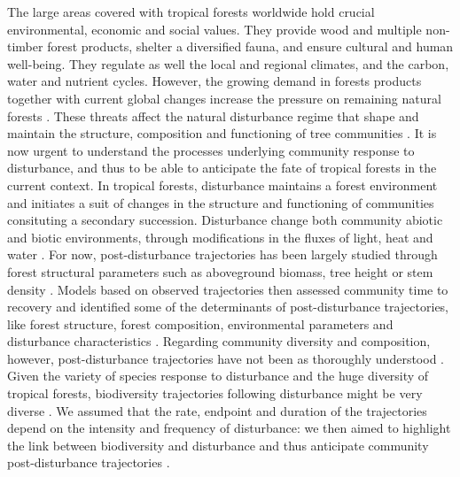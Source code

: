 \documentclass[fleqn,10pt]{ArtEcoFoG} %
\begin{document}
The large areas covered with tropical forests worldwide hold crucial
environmental, economic and social values. They provide wood and
multiple non-timber forest products, shelter a diversified fauna, and
ensure cultural and human well-being. They regulate as well the local
and regional climates, and the carbon, water and nutrient cycles.
However, the growing demand in forests products together with current
global changes increase the pressure on remaining natural forests
\citep{Morales-Hidalgo2015}. These threats affect the natural
disturbance regime that shape and maintain the structure, composition
and functioning of tree communities
\citep{Schnitzer2001, Anderson-Teixeira2013, Sist2015}. It is now urgent
to understand the processes underlying community response to
disturbance, and thus to be able to anticipate the fate of tropical
forests in the current context. In tropical forests, disturbance
maintains a forest environment and initiates a suit of changes in the
structure and functioning of communities consituting a secondary
succession. Disturbance change both community abiotic and biotic
environments, through modifications in the fluxes of light, heat and
water \citep{Goulamoussene2017}. For now, post-disturbance trajectories
has been largely studied through forest structural parameters such as
aboveground biomass, tree height or stem density
\citep{Piponiot2016, Rutishauser2016}. Models based on observed
trajectories then assessed community time to recovery and identified
some of the determinants of post-disturbance trajectories, like forest
structure, forest composition, environmental parameters and disturbance
characteristics \citep{Herault2018}. Regarding community diversity and
composition, however, post-disturbance trajectories have not been as
thoroughly understood \citep{Guitet2018, Molino2001}. Given the variety
of species response to disturbance and the huge diversity of tropical
forests, biodiversity trajectories following disturbance might be very
diverse \citep{Lindenmayer2012, Garcia_florez2017}. We assumed that the
rate, endpoint and duration of the trajectories depend on the intensity
and frequency of disturbance: we then aimed to highlight the link
between biodiversity and disturbance and thus anticipate community
post-disturbance trajectories \citep{Chazdon2003a, Willig2018}.
\end{document}
